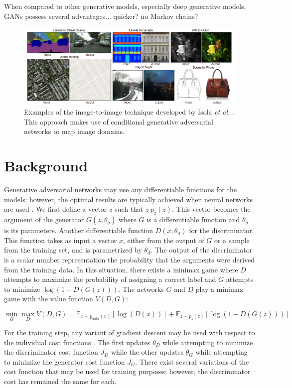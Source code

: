 \documentclass[11pt]{article}
\begin{document}
When compared to other generative models, especially deep generative models, GANs possess several advantages... quicker? no Markov chains?

\begin{figure}
\centering
\includegraphics[scale=0.65]{img2img}
\caption{Examples of the image-to-image technique developed by Isola \textit{et al.} \citep{2016arXiv161107004I}. This approach makes use of conditional generative adversarial networks to map image domains.}
\label{fig:Image to Image Examples}
\end{figure}

\section{Background}
Generative adversarial networks may use any differentiable functions for the models; however, the optimal results are typically achieved when neural networks are used \citep{2014arXiv1406.2661G}. We first define a vector $z$ such that $z~p_z(z)$. This vector becomes the argument of the generator $G(z;\theta_g)$ where $G$ is a differentiable function and $\theta_g$ is its parameters. Another differentiable function $D(x;\theta_d)$ for the discriminator. This function takes as input a vector $x$, either from the output of $G$ or a sample from the training set, and is parametrized by $\theta_d$. The output of the discriminator is a scalar number representation the probability that the arguments were derived from the training data. In this situation, there exists a minimax game where $D$ attempts to maximize the probability of assigning a correct label and $G$ attempts to minimize $\log(1-D(G(z)))$. The networks $G$ and $D$ play a minimax game with the value function $V(D,G)$:

$$\min_{G}\max_{D}V(D, G) = \mathbb{E}_{x\sim p_{data}(x)}[\log(D(x))] + \mathbb{E}_{z\sim p_z(z)}[\log(1-D(G(z)))]$$

For the training step, any variant of gradient descent may be used with respect to the individual cost functions \citep{2017arXiv170100160G}. The first updates $\theta_D$ while attempting to minimize the discriminator cost function $J_D$ while the other updates $\theta_G$ while attempting to minimize the generator cost function $J_G$. There exist several variations of the cost function that may be used for training purposes; however, the discriminator cost has remained the same for each.
\end{document}
